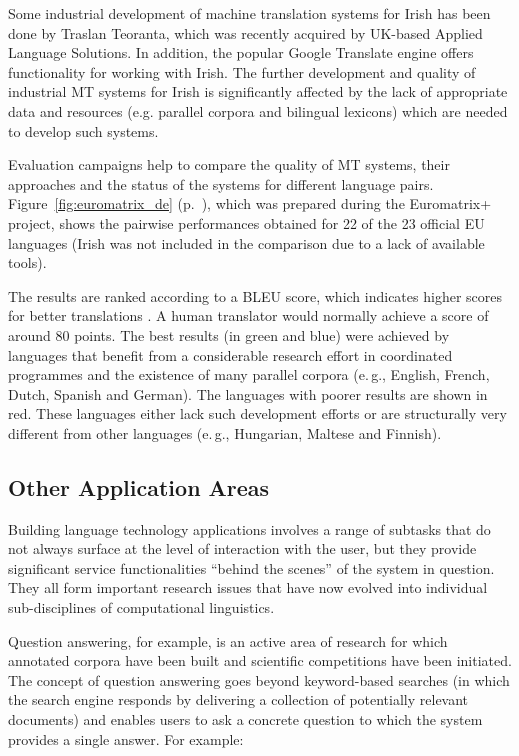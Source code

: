 \begin{multicols}{2}
Some industrial development of machine translation systems for Irish has been done by Traslan Teoranta, which was recently acquired by UK-based Applied Language Solutions. In addition, the popular Google Translate engine offers functionality for working with Irish. The further development and quality of industrial MT systems for Irish is significantly affected by the lack of appropriate data and resources (e.g. parallel corpora and bilingual lexicons) which are needed to develop such systems.

Evaluation campaigns help to compare the quality of MT systems, their approaches and the status of the systems for different language pairs. Figure~\ref{fig:euromatrix_de} (p.~\pageref{fig:euromatrix_de}), which was prepared during the Euromatrix+ project, shows the pairwise performances obtained for 22 of the 23 official EU languages (Irish was not included in the comparison due to a lack of available tools). 

The results are ranked according to a BLEU score, which indicates higher scores for better translations \cite{bleu1}. A human translator would normally achieve a score of around 80 points. The best results (in green and blue) were achieved by languages that benefit from a considerable research effort in coordinated programmes and the existence of many parallel corpora (e.\,g., English, French, Dutch, Spanish and German). The languages with poorer results are shown in red. These languages either lack such development efforts or are structurally very different from other languages (e.\,g., Hungarian, Maltese and Finnish).

\subsection{Other Application Areas}

Building language technology applications involves a range of subtasks that do not always surface at the level of interaction with the user, but they provide significant service functionalities ``behind the scenes'' of the system in question. They all form important research issues that have now evolved into individual sub-disciplines of computational linguistics. 

Question answering, for example, is an active area of research for which annotated corpora have been built and scientific competitions have been initiated. The concept of question answering goes beyond keyword-based searches (in which the search engine responds by delivering a collection of potentially relevant documents) and enables users to ask a concrete question to which the system provides a single answer. For example:


\end{multicols}
